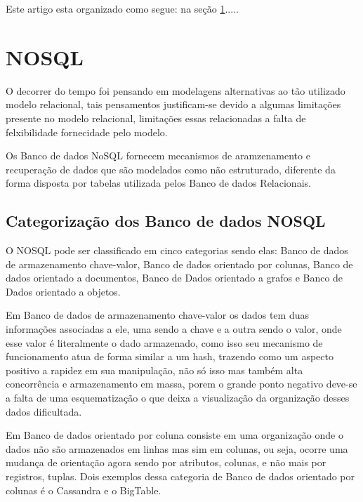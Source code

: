 \documentclass[12pt]{article}
\begin{document}
Este artigo esta organizado como segue: na seção \ref{sec:nosql}.....


\section{NOSQL} 
\label{sec:nosql}

O decorrer do tempo foi pensando em modelagens alternativas ao tão utilizado modelo relacional, tais pensamentos justificam-se devido a algumas limitações presente no modelo relacional, limitações essas relacionadas a falta de felxibilidade fornecidade pelo modelo.

Os Banco de dados NoSQL fornecem mecanismos de aramzenamento e recuperação de dados que são modelados como não estruturado, diferente da forma disposta por tabelas utilizada pelos Banco de dados Relacionais. \cite{zhaoSchema:2014}




\subsection{Categorização dos Banco de dados NOSQL}
\label{subsec:categorizacao}

O NOSQL pode ser classificado em cinco categorias \cite{typeNOSQL:2013} sendo elas: Banco de dados de armazenamento chave-valor, Banco de dados orientado por colunas, Banco de dados orientado a documentos, Banco de Dados orientado a grafos e Banco de Dados orientado a objetos.

Em Banco de dados de armazenamento chave-valor os dados tem duas informações associadas a ele, uma sendo a chave e a outra sendo o valor, onde esse valor é literalmente o dado armazenado, como isso seu mecanismo de funcionamento atua de forma similar a um hash, trazendo como um aspecto positivo a rapidez em sua manipulação, não só isso mas também alta concorrência e armazenamento em massa, porem o grande ponto negativo deve-se a falta de uma esquematização o que deixa a visualização da organização desses dados dificultada. \cite{typeNOSQL:2013}

Em Banco de dados orientado por coluna consiste em uma organização onde o dados não são armazenados em linhas mas sim em colunas, ou seja, ocorre uma mudança de orientação agora sendo por atributos, colunas, e não mais por registros, tuplas. Dois exemplos dessa categoria de Banco de dados orientado por colunas é o Cassandra e o BigTable. \cite{brito2010bancos}\cite{surveyNosql:2012}
\end{document}
